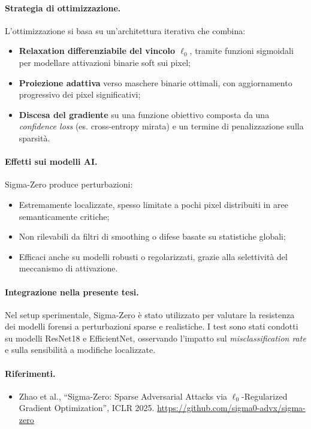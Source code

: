 \paragraph{Strategia di ottimizzazione.}
L’ottimizzazione si basa su un’architettura iterativa che combina:
\begin{itemize}
    \item \textbf{Relaxation differenziabile del vincolo $\ell_0$}, tramite funzioni sigmoidali per modellare attivazioni binarie soft sui pixel;
    \item \textbf{Proiezione adattiva} verso maschere binarie ottimali, con aggiornamento progressivo dei pixel significativi;
    \item \textbf{Discesa del gradiente} su una funzione obiettivo composta da una \textit{confidence loss} (es. cross-entropy mirata) e un termine di penalizzazione sulla sparsità.
\end{itemize}

\paragraph{Effetti sui modelli AI.}
Sigma-Zero produce perturbazioni:
\begin{itemize}
    \item Estremamente localizzate, spesso limitate a pochi pixel distribuiti in aree semanticamente critiche;
    \item Non rilevabili da filtri di smoothing o difese basate su statistiche globali;
    \item Efficaci anche su modelli robusti o regolarizzati, grazie alla selettività del meccanismo di attivazione.
\end{itemize}

\paragraph{Integrazione nella presente tesi.}
Nel setup sperimentale, Sigma-Zero è stato utilizzato per valutare la resistenza dei modelli forensi a perturbazioni sparse e realistiche. I test sono stati condotti su modelli ResNet18 e EfficientNet, osservando l’impatto sul \textit{misclassification rate} e sulla sensibilità a modifiche localizzate.

\paragraph{Riferimenti.}
\begin{itemize}
    \item Zhao et al., “Sigma-Zero: Sparse Adversarial Attacks via $\ell_0$-Regularized Gradient Optimization”, ICLR 2025. \url{https://github.com/sigma0-advx/sigma-zero}
\end{itemize}



